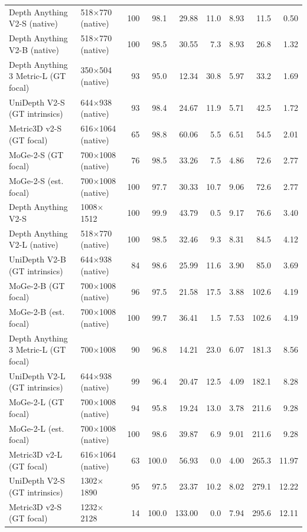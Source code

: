 \begin{tabular}{llrrrrrrr}
\midrule
Depth Anything V2-S (native) & 518$\times$770 (native) & 100 & 98.1 & 29.88 & 11.0 & 8.93 & 11.5 & 0.50 \\
Depth Anything V2-B (native) & 518$\times$770 (native) & 100 & 98.5 & 30.55 & 7.3 & 8.93 & 26.8 & 1.32 \\
Depth Anything 3 Metric-L (GT focal) & 350$\times$504 (native) & 93 & 95.0 & 12.34 & 30.8 & 5.97 & 33.2 & 1.69 \\
UniDepth V2-S (GT intrinsics) & 644$\times$938 (native) & 93 & 98.4 & 24.67 & 11.9 & 5.71 & 42.5 & 1.72 \\
Metric3D v2-S (GT focal) & 616$\times$1064 (native) & 65 & 98.8 & 60.06 & 5.5 & 6.51 & 54.5 & 2.01 \\
MoGe-2-S (GT focal) & 700$\times$1008 (native) & 76 & 98.5 & 33.26 & 7.5 & 4.86 & 72.6 & 2.77 \\
MoGe-2-S (est. focal) & 700$\times$1008 (native) & 100 & 97.7 & 30.33 & 10.7 & 9.06 & 72.6 & 2.77 \\
Depth Anything V2-S & 1008$\times$1512 & 100 & 99.9 & 43.79 & 0.5 & 9.17 & 76.6 & 3.40 \\
Depth Anything V2-L (native) & 518$\times$770 (native) & 100 & 98.5 & 32.46 & 9.3 & 8.31 & 84.5 & 4.12 \\
UniDepth V2-B (GT intrinsics) & 644$\times$938 (native) & 84 & 98.6 & 25.99 & 11.6 & 3.90 & 85.0 & 3.69 \\
MoGe-2-B (GT focal) & 700$\times$1008 (native) & 96 & 97.5 & 21.58 & 17.5 & 3.88 & 102.6 & 4.19 \\
MoGe-2-B (est. focal) & 700$\times$1008 (native) & 100 & 99.7 & 36.41 & 1.5 & 7.53 & 102.6 & 4.19 \\
Depth Anything 3 Metric-L (GT focal) & 700$\times$1008 & 90 & 96.8 & 14.21 & 23.0 & 6.07 & 181.3 & 8.56 \\
UniDepth V2-L (GT intrinsics) & 644$\times$938 (native) & 99 & 96.4 & 20.47 & 12.5 & 4.09 & 182.1 & 8.28 \\
MoGe-2-L (GT focal) & 700$\times$1008 (native) & 94 & 95.8 & 19.24 & 13.0 & 3.78 & 211.6 & 9.28 \\
MoGe-2-L (est. focal) & 700$\times$1008 (native) & 100 & 98.6 & 39.87 & 6.9 & 9.01 & 211.6 & 9.28 \\
Metric3D v2-L (GT focal) & 616$\times$1064 (native) & 63 & 100.0 & 56.93 & 0.0 & 4.00 & 265.3 & 11.97 \\
UniDepth V2-S (GT intrinsics) & 1302$\times$1890 & 95 & 97.5 & 23.37 & 10.2 & 8.02 & 279.1 & 12.22 \\
Metric3D v2-S (GT focal) & 1232$\times$2128 & 14 & 100.0 & 133.00 & 0.0 & 7.94 & 295.6 & 12.11 \\

\end{tabular}
